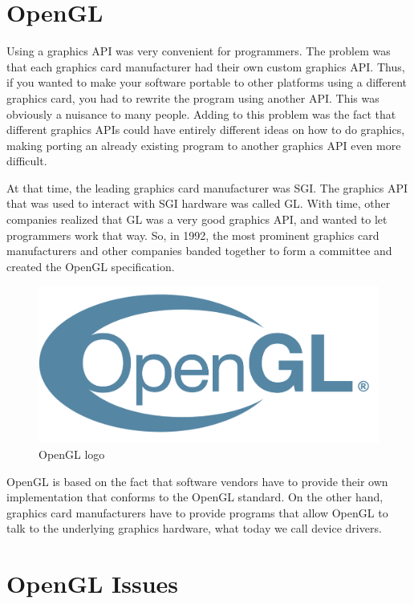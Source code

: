 \section{OpenGL}

Using a graphics API was very convenient for programmers.
The problem was that each graphics card manufacturer had their own custom
graphics API.
Thus, if you wanted to make your software portable to other platforms using
a different graphics card, you had to rewrite the program using another API.
This was obviously a nuisance to many people.
Adding to this problem was the fact that different graphics APIs could
have entirely different ideas on how to do graphics, making porting an already
existing program to another graphics API even more difficult.

At that time, the leading graphics card manufacturer was SGI.
The graphics API that was used to interact with SGI hardware was called GL.
With time, other companies realized that GL was a very good graphics API,
and wanted to let programmers work that way.
So, in 1992, the most prominent graphics card manufacturers and other companies
banded together to form a committee and created the OpenGL specification.

\begin{figure}[ht]
    \centering
    \includegraphics[scale=0.10]{images/ChVulkan/OpenGlLogo.png}
    \caption{OpenGL logo}
    \label{fig::OpenGLLogo}
\end{figure}

OpenGL is based on the fact that software vendors have to
provide their own implementation that conforms to the OpenGL standard.
On the other hand, graphics card manufacturers have to provide programs
that allow OpenGL to talk to the underlying graphics hardware, what today we
call device drivers.

\section{OpenGL Issues}

